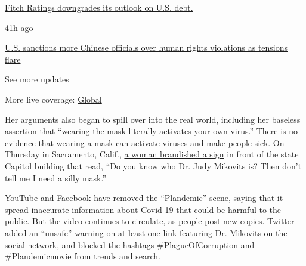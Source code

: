 \href{https://www.nytimes.com/live/2020/07/31/business/stock-market-today-coronavirus?action=click\&pgtype=Article\&state=default\&region=MAIN_CONTENT_1\&context=storylines_live_updates\#fitch-ratings-downgrades-its-outlook-on-us-debt}{Fitch
Ratings downgrades its outlook on U.S. debt.}

\href{https://www.nytimes.com/live/2020/07/31/business/stock-market-today-coronavirus?action=click\&pgtype=Article\&state=default\&region=MAIN_CONTENT_1\&context=storylines_live_updates\#us-sanctions-more-chinese-officials-over-human-rights-violations-as-tensions-flare}{41h
ago}

\href{https://www.nytimes.com/live/2020/07/31/business/stock-market-today-coronavirus?action=click\&pgtype=Article\&state=default\&region=MAIN_CONTENT_1\&context=storylines_live_updates\#us-sanctions-more-chinese-officials-over-human-rights-violations-as-tensions-flare}{U.S.
sanctions more Chinese officials over human rights violations as
tensions flare}

\href{https://www.nytimes.com/live/2020/07/31/business/stock-market-today-coronavirus?action=click\&pgtype=Article\&state=default\&region=MAIN_CONTENT_1\&context=storylines_live_updates}{See
more updates}

More live coverage:
\href{https://www.nytimes.com/2020/08/01/world/coronavirus-covid-19.html?action=click\&pgtype=Article\&state=default\&region=MAIN_CONTENT_1\&context=storylines_live_updates}{Global}

Her arguments also began to spill over into the real world, including
her baseless assertion that ``wearing the mask literally activates your
own virus.'' There is no evidence that wearing a mask can activate
viruses and make people sick. On Thursday in Sacramento, Calif.,
\href{https://twitter.com/mikeblountsac/status/1258439584507031552}{a
woman brandished a sign} in front of the state Capitol building that
read, ``Do you know who Dr. Judy Mikovits is? Then don't tell me I need
a silly mask.''

YouTube and Facebook have removed the ``Plandemic'' scene, saying that
it spread inaccurate information about Covid-19 that could be harmful to
the public. But the video continues to circulate, as people post new
copies. Twitter added an ``unsafe'' warning on
\href{https://twitter.com/DrJudyAMikovits/status/1257425999408611330}{at
least one link} featuring Dr. Mikovits on the social network, and
blocked the hashtags \#PlagueOfCorruption and \#Plandemicmovie from
trends and search.

